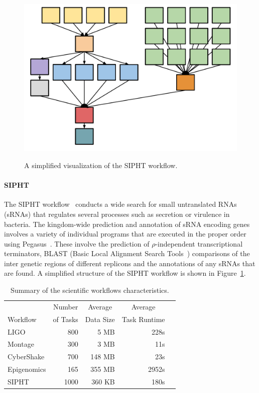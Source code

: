 \begin{figure}[htb]
	\centering
	\includegraphics[width=0.5\linewidth]{figures/workflowsim/sipht_shape.pdf} \\
	\caption{A simplified visualization of the SIPHT workflow.}
	\label{fig:model_shape_sipht}
\end{figure}

\paragraph{\textbf{SIPHT}}
The SIPHT workflow~\cite{SIPHT} conducts a wide search for small untranslated RNAs (sRNAs) that regulates several processes such as secretion or virulence in bacteria. The kingdom-wide prediction and annotation of sRNA encoding genes involves a variety of individual programs that are executed in the proper order using Pegasus~\cite{Deelman2004}. These involve the prediction of $\rho$-independent transcriptional terminators, BLAST (Basic Local Alignment Search Tools~\cite{BLAST}) comparisons of the inter genetic regions of different replicons and the annotations of any sRNAs that are found. A simplified structure of the SIPHT workflow is shown in Figure~\ref{fig:model_shape_sipht}. 




\begin{table}[!htb]
	\setlength{\tabcolsep}{11pt}
	\centering
	\small
	\begin{tabular}{lrrrr}
		\hline
		 & \multicolumn{1}{c}{Number} & \multicolumn{1}{c}{Average} &  \multicolumn{1}{c}{Average} \\
		Workflow	& of Tasks	 & Data Size & Task Runtime \\
		\hline
		LIGO 		&800		& 5 MB	& 228s\\
		Montage 		&300		&3 MB	&11s\\
		CyberShake 	&700		&148 MB 	& 23s\\
		Epigenomics 	&165 	& 355 MB	& 2952s\\
		SIPHT		&1000	& 360 KB 	& 180s\\
		\hline
	\end{tabular}
	\caption{Summary of the scientific workflows characteristics.}
	\label{tab:model_workflows}
\end{table} 

